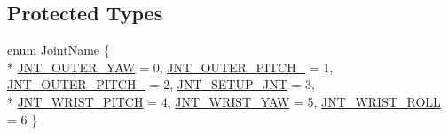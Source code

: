 \subsection*{Protected Types}
\begin{DoxyCompactItemize}
\item 
enum \hyperlink{classmts_intuitive_research_kit_m_t_m_a76e15ff0552b14b45abb0aaa26cb122d}{Joint\+Name} \{ \\*
\hyperlink{classmts_intuitive_research_kit_m_t_m_a76e15ff0552b14b45abb0aaa26cb122dade63397203b20655849d9a523e4aac43}{J\+N\+T\+\_\+\+O\+U\+T\+E\+R\+\_\+\+Y\+A\+W} = 0, 
\hyperlink{classmts_intuitive_research_kit_m_t_m_a76e15ff0552b14b45abb0aaa26cb122da51b3f647a65a660717fc7a394f62447b}{J\+N\+T\+\_\+\+O\+U\+T\+E\+R\+\_\+\+P\+I\+T\+C\+H\+\_} = 1, 
\hyperlink{classmts_intuitive_research_kit_m_t_m_a76e15ff0552b14b45abb0aaa26cb122da3c8b9bb2448a09024a9aecbbe56723d8}{J\+N\+T\+\_\+\+O\+U\+T\+E\+R\+\_\+\+P\+I\+T\+C\+H\+\_} = 2, 
\hyperlink{classmts_intuitive_research_kit_m_t_m_a76e15ff0552b14b45abb0aaa26cb122daf6c47398b783f389c2f0ba1dae4555bc}{J\+N\+T\+\_\+\+S\+E\+T\+U\+P\+\_\+\+J\+N\+T} = 3, 
\\*
\hyperlink{classmts_intuitive_research_kit_m_t_m_a76e15ff0552b14b45abb0aaa26cb122da13633ee4dc909b62f70a0d8fd9100b03}{J\+N\+T\+\_\+\+W\+R\+I\+S\+T\+\_\+\+P\+I\+T\+C\+H} = 4, 
\hyperlink{classmts_intuitive_research_kit_m_t_m_a76e15ff0552b14b45abb0aaa26cb122dabb6190cb73f32fd6383d6bd7c1dd7caa}{J\+N\+T\+\_\+\+W\+R\+I\+S\+T\+\_\+\+Y\+A\+W} = 5, 
\hyperlink{classmts_intuitive_research_kit_m_t_m_a76e15ff0552b14b45abb0aaa26cb122daf556c23d62e223b033adc4ee32718a95}{J\+N\+T\+\_\+\+W\+R\+I\+S\+T\+\_\+\+R\+O\+L\+L} = 6
 \}
\end{DoxyCompactItemize}

